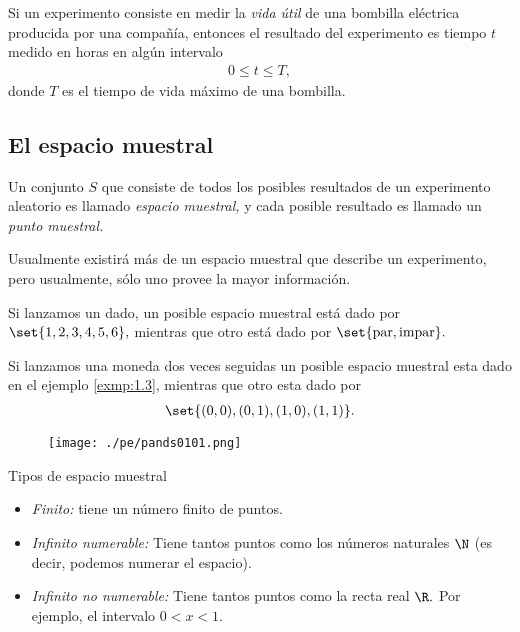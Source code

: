  \begin{exmp}
  \label{exmp:1.5}
  Si un experimento consiste en medir la \emph{vida útil} de una bombilla eléctrica producida por una compa\~nía, entonces el resultado del experimento es tiempo $t$ medido en horas en algún intervalo
  \begin{align*}
   0\leq t \leq T,
  \end{align*}
donde $T$ es el tiempo de vida máximo de una bombilla.
 \end{exmp}



\subsection{El espacio muestral}
{}
Un conjunto $S$ que consiste de todos los posibles resultados de un experimento aleatorio es llamado \emph{espacio muestral,}  y cada posible resultado es llamado un \emph{punto muestral.}

Usualmente existirá más de un espacio muestral que describe un experimento, pero usualmente, sólo uno provee la mayor información.

{}
\begin{exmp}
 \label{exmp:1.6}
 Si lanzamos un dado, un posible espacio muestral está dado por $\set{1,2,3,4,5,6},$  mientras que otro está dado por $\set{\text{par},\text{impar}}.$
\end{exmp}


{}
\begin{exmp}
 \label{exmp:1.7}
 Si lanzamos una moneda dos veces seguidas un posible espacio muestral esta dado en el ejemplo \ref{exmp:1.3},  mientras que otro esta dado por
 \begin{align*}
\set{(0,0), (0,1), (1,0),(1,1)}.
\end{align*}
\end{exmp}



\begin{figure}
 \centering
 \texttt{[image: ./pe/pands0101.png]}
 \label{fig:0101}
\end{figure}


{Tipos de espacio muestral}
\begin{itemize}
 \item \emph{Finito:} tiene un número finito de puntos.
 \item \emph{Infinito numerable:} Tiene tantos puntos como los números naturales $\N$ (es decir, podemos numerar el espacio).
 \item \emph{Infinito no numerable:} Tiene tantos puntos como la recta real $\R.$  Por ejemplo, el intervalo $0<x<1.$
\end{itemize}


